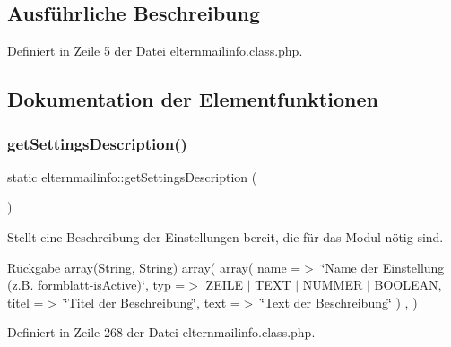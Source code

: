 \subsection{Ausführliche Beschreibung}


Definiert in Zeile 5 der Datei elternmailinfo.\+class.\+php.



\subsection{Dokumentation der Elementfunktionen}
\mbox{\label{classelternmailinfo_ae70e1d4118a4e8f3572bc692ebe530d4}} 
\subsubsection{\texorpdfstring{get\+Settings\+Description()}{getSettingsDescription()}}
{\footnotesize\ttfamily static elternmailinfo\+::get\+Settings\+Description (\begin{DoxyParamCaption}{ }\end{DoxyParamCaption})\hspace{0.3cm}{\ttfamily [static]}}

Stellt eine Beschreibung der Einstellungen bereit, die für das Modul nötig sind. \begin{DoxyReturn}{Rückgabe}
array(\+String, String) array( array( \textquotesingle{}name\textquotesingle{} =$>$ \char`\"{}\+Name der Einstellung (z.\+B. formblatt-\/is\+Active)\char`\"{}, \textquotesingle{}typ\textquotesingle{} =$>$ Z\+E\+I\+LE $\vert$ T\+E\+XT $\vert$ N\+U\+M\+M\+ER $\vert$ B\+O\+O\+L\+E\+AN, \textquotesingle{}titel\textquotesingle{} =$>$ \char`\"{}\+Titel der Beschreibung\char`\"{}, \textquotesingle{}text\textquotesingle{} =$>$ \char`\"{}\+Text der Beschreibung\char`\"{} ) , ) 
\end{DoxyReturn}


Definiert in Zeile 268 der Datei elternmailinfo.\+class.\+php.

\mbox{\label{classelternmailinfo_aca08aee08bbee2942fd223f7ebc05c66}} 
